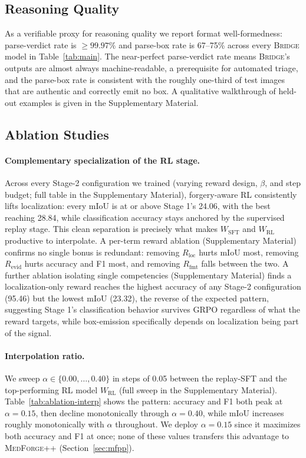 \documentclass[10pt,twocolumn,letterpaper]{article}
\newcommand{\bridge}{\textsc{Bridge}}
\newcommand{\medforgepp}{\textsc{MedForge++}}
\begin{document}
\subsection{Reasoning Quality}
\label{sec:reasoning}
As a verifiable proxy for reasoning quality we report format well-formedness: parse-verdict rate is $\ge 99.97\%$ and parse-box rate is 67--75\% across every \bridge{} model in Table~\ref{tab:main}. The near-perfect parse-verdict rate means \bridge{}'s outputs are almost always machine-readable, a prerequisite for automated triage, and the parse-box rate is consistent with the roughly one-third of test images that are authentic and correctly emit no box. A qualitative walkthrough of held-out examples is given in the Supplementary Material.

\subsection{Ablation Studies}
\label{sec:ablation}
\paragraph{Complementary specialization of the RL stage.} Across every Stage-2 configuration we trained (varying reward design, $\beta$, and step budget; full table in the Supplementary Material), forgery-aware RL consistently lifts localization: every mIoU is at or above Stage 1's 24.06, with the best reaching 28.84, while classification accuracy stays anchored by the supervised replay stage. This clean separation is precisely what makes $W_{\mathrm{SFT}}$ and $W_{\mathrm{RL}}$ productive to interpolate. A per-term reward ablation (Supplementary Material) confirms no single bonus is redundant: removing $R_{\mathrm{loc}}$ hurts mIoU most, removing $R_{\mathrm{evid}}$ hurts accuracy and F1 most, and removing $R_{\mathrm{fmt}}$ falls between the two. A further ablation isolating single competencies (Supplementary Material) finds a localization-only reward reaches the highest accuracy of any Stage-2 configuration (95.46) but the lowest mIoU (23.32), the reverse of the expected pattern, suggesting Stage 1's classification behavior survives GRPO regardless of what the reward targets, while box-emission specifically depends on localization being part of the signal.

\paragraph{Interpolation ratio.} We sweep $\alpha \in \{0.00, \ldots, 0.40\}$ in steps of 0.05 between the replay-SFT and the top-performing RL model $W_{\mathrm{RL}}$ (full sweep in the Supplementary Material). Table~\ref{tab:ablation-interp} shows the pattern: accuracy and F1 both peak at $\alpha{=}0.15$, then decline monotonically through $\alpha{=}0.40$, while mIoU increases roughly monotonically with $\alpha$ throughout. We deploy $\alpha{=}0.15$ since it maximizes both accuracy and F1 at once; none of these values transfers this advantage to \medforgepp{} (Section~\ref{sec:mfpp}).
\end{document}
